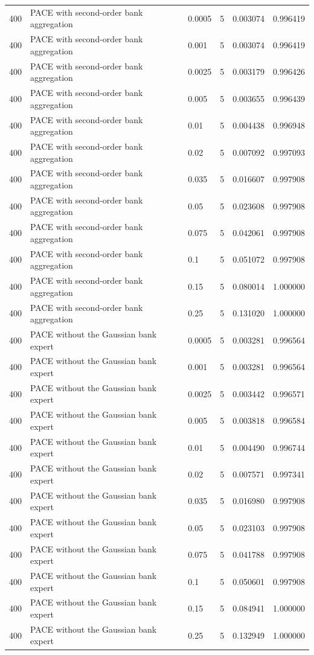 \begin{tabular}{llllll}
400 & PACE with second-order bank aggregation & 0.0005 & 5 & 0.003074 & 0.996419 \\
400 & PACE with second-order bank aggregation & 0.001 & 5 & 0.003074 & 0.996419 \\
400 & PACE with second-order bank aggregation & 0.0025 & 5 & 0.003179 & 0.996426 \\
400 & PACE with second-order bank aggregation & 0.005 & 5 & 0.003655 & 0.996439 \\
400 & PACE with second-order bank aggregation & 0.01 & 5 & 0.004438 & 0.996948 \\
400 & PACE with second-order bank aggregation & 0.02 & 5 & 0.007092 & 0.997093 \\
400 & PACE with second-order bank aggregation & 0.035 & 5 & 0.016607 & 0.997908 \\
400 & PACE with second-order bank aggregation & 0.05 & 5 & 0.023608 & 0.997908 \\
400 & PACE with second-order bank aggregation & 0.075 & 5 & 0.042061 & 0.997908 \\
400 & PACE with second-order bank aggregation & 0.1 & 5 & 0.051072 & 0.997908 \\
400 & PACE with second-order bank aggregation & 0.15 & 5 & 0.080014 & 1.000000 \\
400 & PACE with second-order bank aggregation & 0.25 & 5 & 0.131020 & 1.000000 \\
400 & PACE without the Gaussian bank expert & 0.0005 & 5 & 0.003281 & 0.996564 \\
400 & PACE without the Gaussian bank expert & 0.001 & 5 & 0.003281 & 0.996564 \\
400 & PACE without the Gaussian bank expert & 0.0025 & 5 & 0.003442 & 0.996571 \\
400 & PACE without the Gaussian bank expert & 0.005 & 5 & 0.003818 & 0.996584 \\
400 & PACE without the Gaussian bank expert & 0.01 & 5 & 0.004490 & 0.996744 \\
400 & PACE without the Gaussian bank expert & 0.02 & 5 & 0.007571 & 0.997341 \\
400 & PACE without the Gaussian bank expert & 0.035 & 5 & 0.016980 & 0.997908 \\
400 & PACE without the Gaussian bank expert & 0.05 & 5 & 0.023103 & 0.997908 \\
400 & PACE without the Gaussian bank expert & 0.075 & 5 & 0.041788 & 0.997908 \\
400 & PACE without the Gaussian bank expert & 0.1 & 5 & 0.050601 & 0.997908 \\
400 & PACE without the Gaussian bank expert & 0.15 & 5 & 0.084941 & 1.000000 \\
400 & PACE without the Gaussian bank expert & 0.25 & 5 & 0.132949 & 1.000000 \\
\bottomrule
\end{tabular}
